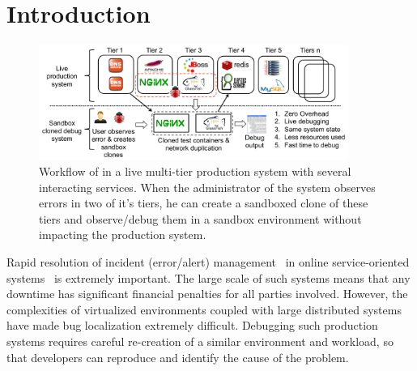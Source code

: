 \section{Introduction}
\label{sec:parikshan-intro}
\begin{figure}[ht!]
	\begin{center}
		\includegraphics[width=0.9\textwidth]{parikshan/figs/workflow3.pdf}
		\caption{Workflow of \parikshan in a live multi-tier production system with several interacting services. When the administrator of the system observes errors in two of it's tiers, he can create a sandboxed clone of these tiers and observe/debug them in a sandbox environment without impacting the production system.}
		\label{fig:motivation}
	\end{center}
\end{figure}

Rapid resolution of incident (error/alert) management~\cite{sasase2013} in online service-oriented systems~\cite{microservice-book,hdfs,cassandra,redis} is extremely important.
The large scale of such systems means that any downtime has significant financial penalties for all parties involved.
However, the complexities of virtualized environments coupled with large distributed systems have made bug localization extremely difficult.
Debugging such production systems requires careful re-creation of a similar
environment and workload, so that developers can reproduce and identify the cause of the problem.

